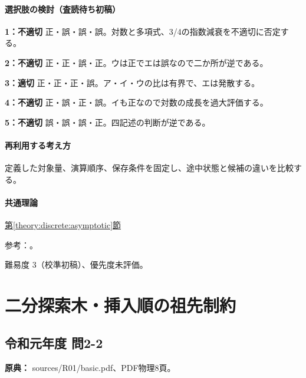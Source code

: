 \paragraph{選択肢の検討（査読待ち初稿）}\mbox{}\par

\noindent\textbf{1：不適切} 正・誤・誤・誤。対数と多項式、3/4の指数減衰を不適切に否定する。\par

\noindent\textbf{2：不適切} 正・正・誤・正。ウは正でエは誤なので二か所が逆である。\par

\noindent\textbf{3：適切} 正・正・正・誤。ア・イ・ウの比は有界で、エは発散する。\par

\noindent\textbf{4：不適切} 正・誤・正・誤。イも正なので対数の成長を過大評価する。\par

\noindent\textbf{5：不適切} 誤・誤・誤・正。四記述の判断が逆である。\par

\paragraph{再利用する考え方} 定義した対象量、演算順序、保存条件を固定し、途中状態と候補の違いを比較する。

\paragraph{共通理論} \hyperref[theory:discrete:asymptotic]{第\ref*{theory:discrete:asymptotic}節}

\par 参考：\cite{mit_discrete2015}。

\par 難易度 3（校準初稿）、優先度未評価。

\section{二分探索木・挿入順の祖先制約}

\subsection{令和元年度 問2-2}
\label{q:r01-reg-basic-2-2}

\noindent\textbf{原典：} sources/R01/basic.pdf、PDF物理8頁。

